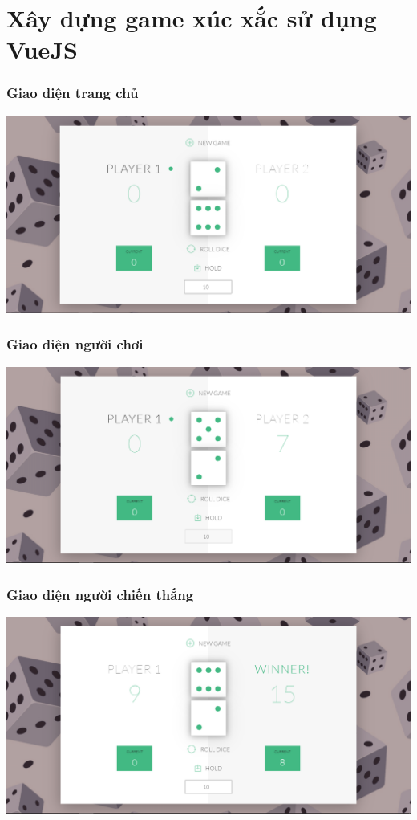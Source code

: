 \documentclass[12pt,a4paper]{report}
\begin{document}
\section{Xây dựng  game xúc xắc sử dụng VueJS}
\subsubsection{Giao diện trang chủ} 
\begin{center}
	\includegraphics[scale=.42]{69}
\end{center}
\subsubsection{Giao diện người chơi} 
\begin{center}
	\includegraphics[scale=.42]{70}
\end{center}
\subsubsection{Giao diện người chiến thắng} 
\begin{center}
	\includegraphics[scale=.42]{71}
\end{center}
\end{document}
